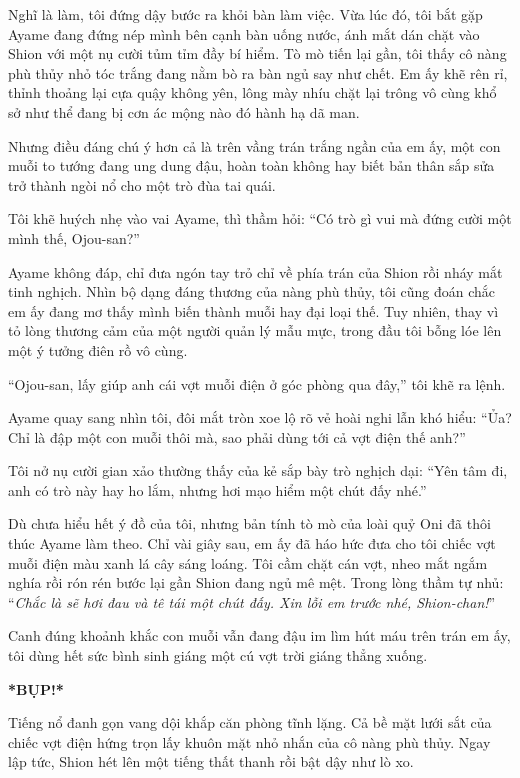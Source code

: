 \documentclass[../main.tex]{subfiles}
\begin{document}
Nghĩ là làm, tôi đứng dậy bước ra khỏi bàn làm việc. Vừa lúc đó, tôi bắt gặp Ayame đang đứng nép mình bên cạnh bàn uống nước, ánh mắt dán chặt vào Shion với một nụ cười tủm tỉm đầy bí hiểm. Tò mò tiến lại gần, tôi thấy cô nàng phù thủy nhỏ tóc trắng đang nằm bò ra bàn ngủ say như chết. Em ấy khẽ rên rỉ, thỉnh thoảng lại cựa quậy không yên, lông mày nhíu chặt lại trông vô cùng khổ sở như thể đang bị cơn ác mộng nào đó hành hạ dã man.


Nhưng điều đáng chú ý hơn cả là trên vầng trán trắng ngần của em ấy, một con muỗi to tướng đang ung dung đậu, hoàn toàn không hay biết bản thân sắp sửa trở thành ngòi nổ cho một trò đùa tai quái.

Tôi khẽ huých nhẹ vào vai Ayame, thì thầm hỏi: ``Có trò gì vui mà đứng cười một mình thế, Ojou-san?''

Ayame không đáp, chỉ đưa ngón tay trỏ chỉ về phía trán của Shion rồi nháy mắt tinh nghịch. Nhìn bộ dạng đáng thương của nàng phù thủy, tôi cũng đoán chắc em ấy đang mơ thấy mình biến thành muỗi hay đại loại thế. Tuy nhiên, thay vì tỏ lòng thương cảm của một người quản lý mẫu mực, trong đầu tôi bỗng lóe lên một ý tưởng điên rồ vô cùng.

``Ojou-san, lấy giúp anh cái vợt muỗi điện ở góc phòng qua đây,'' tôi khẽ ra lệnh.

Ayame quay sang nhìn tôi, đôi mắt tròn xoe lộ rõ vẻ hoài nghi lẫn khó hiểu: ``Ủa? Chỉ là đập một con muỗi thôi mà, sao phải dùng tới cả vợt điện thế anh?''

Tôi nở nụ cười gian xảo thường thấy của kẻ sắp bày trò nghịch dại: ``Yên tâm đi, anh có trò này hay ho lắm, nhưng hơi mạo hiểm một chút đấy nhé.''

Dù chưa hiểu hết ý đồ của tôi, nhưng bản tính tò mò của loài quỷ Oni đã thôi thúc Ayame làm theo. Chỉ vài giây sau, em ấy đã háo hức đưa cho tôi chiếc vợt muỗi điện màu xanh lá cây sáng loáng. Tôi cầm chặt cán vợt, nheo mắt ngắm nghía rồi rón rén bước lại gần Shion đang ngủ mê mệt. Trong lòng thầm tự nhủ: ``\textit{Chắc là sẽ hơi đau và tê tái một chút đấy. Xin lỗi em trước nhé, Shion-chan!}''

Canh đúng khoảnh khắc con muỗi vẫn đang đậu im lìm hút máu trên trán em ấy, tôi dùng hết sức bình sinh giáng một cú vợt trời giáng thẳng xuống.

\textbf{*BỤP!*}

Tiếng nổ đanh gọn vang dội khắp căn phòng tĩnh lặng. Cả bề mặt lưới sắt của chiếc vợt điện hứng trọn lấy khuôn mặt nhỏ nhắn của cô nàng phù thủy. Ngay lập tức, Shion hét lên một tiếng thất thanh rồi bật dậy như lò xo.
\end{document}
